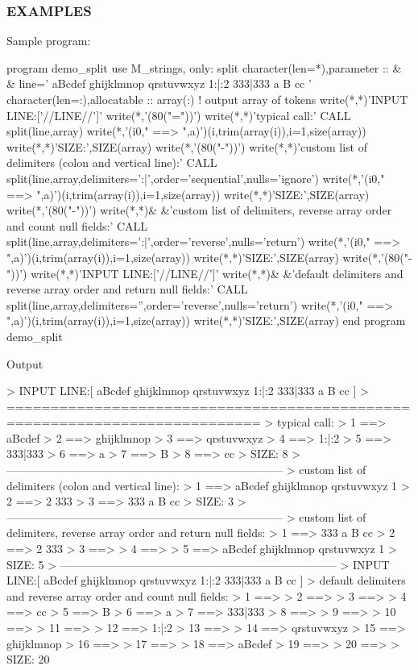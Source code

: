 \subsubsection*{E\+X\+A\+M\+P\+L\+ES}

Sample program\+: \begin{DoxyVerb} program demo_split
 use M_strings, only: split
 character(len=*),parameter     :: &
 & line='  aBcdef   ghijklmnop qrstuvwxyz  1:|:2     333|333 a B cc    '
 character(len=:),allocatable :: array(:) ! output array of tokens
    write(*,*)'INPUT LINE:['//LINE//']'
    write(*,'(80("="))')
    write(*,*)'typical call:'
    CALL split(line,array)
    write(*,'(i0," ==> ",a)')(i,trim(array(i)),i=1,size(array))
    write(*,*)'SIZE:',SIZE(array)
    write(*,'(80("-"))')
    write(*,*)'custom list of delimiters (colon and vertical line):'
    CALL split(line,array,delimiters=':|',order='sequential',nulls='ignore')
    write(*,'(i0," ==> ",a)')(i,trim(array(i)),i=1,size(array))
    write(*,*)'SIZE:',SIZE(array)
    write(*,'(80("-"))')
    write(*,*)&
    &'custom list of delimiters, reverse array order and count null fields:'
    CALL split(line,array,delimiters=':|',order='reverse',nulls='return')
    write(*,'(i0," ==> ",a)')(i,trim(array(i)),i=1,size(array))
    write(*,*)'SIZE:',SIZE(array)
    write(*,'(80("-"))')
    write(*,*)'INPUT LINE:['//LINE//']'
    write(*,*)&
    &'default delimiters and reverse array order and return null fields:'
    CALL split(line,array,delimiters='',order='reverse',nulls='return')
    write(*,'(i0," ==> ",a)')(i,trim(array(i)),i=1,size(array))
    write(*,*)'SIZE:',SIZE(array)
end program demo_split
\end{DoxyVerb}


Output \begin{DoxyVerb} > INPUT LINE:[  aBcdef   ghijklmnop qrstuvwxyz  1:|:2     333|333 a B cc    ]
 > ===========================================================================
 >  typical call:
 > 1 ==> aBcdef
 > 2 ==> ghijklmnop
 > 3 ==> qrstuvwxyz
 > 4 ==> 1:|:2
 > 5 ==> 333|333
 > 6 ==> a
 > 7 ==> B
 > 8 ==> cc
 >  SIZE:           8
 > --------------------------------------------------------------------------
 >  custom list of delimiters (colon and vertical line):
 > 1 ==>   aBcdef   ghijklmnop qrstuvwxyz  1
 > 2 ==> 2     333
 > 3 ==> 333 a B cc
 >  SIZE:           3
 > --------------------------------------------------------------------------
 >  custom list of delimiters, reverse array order and return null fields:
 > 1 ==> 333 a B cc
 > 2 ==> 2     333
 > 3 ==>
 > 4 ==>
 > 5 ==>   aBcdef   ghijklmnop qrstuvwxyz  1
 >  SIZE:           5
 > --------------------------------------------------------------------------
 >  INPUT LINE:[  aBcdef   ghijklmnop qrstuvwxyz  1:|:2     333|333 a B cc    ]
 >  default delimiters and reverse array order and count null fields:
 > 1 ==>
 > 2 ==>
 > 3 ==>
 > 4 ==> cc
 > 5 ==> B
 > 6 ==> a
 > 7 ==> 333|333
 > 8 ==>
 > 9 ==>
 > 10 ==>
 > 11 ==>
 > 12 ==> 1:|:2
 > 13 ==>
 > 14 ==> qrstuvwxyz
 > 15 ==> ghijklmnop
 > 16 ==>
 > 17 ==>
 > 18 ==> aBcdef
 > 19 ==>
 > 20 ==>
 >  SIZE:          20
\end{DoxyVerb}
